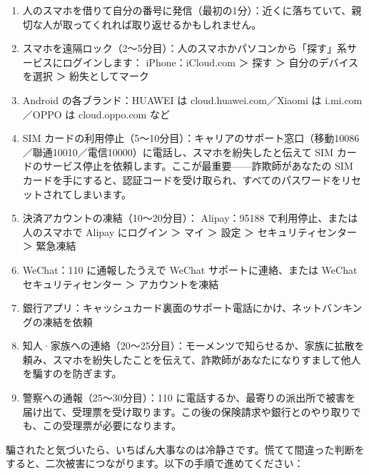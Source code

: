 \begin{enumerate}
  \item 人のスマホを借りて自分の番号に発信（最初の1分）：近くに落ちていて、親切な人が取ってくれれば取り返せるかもしれません。
  \item スマホを遠隔ロック（2〜5分目）：人のスマホかパソコンから「探す」系サービスにログインします： iPhone：iCloud.com ＞ 探す ＞ 自分のデバイスを選択 ＞ 紛失としてマーク
  \item Android の各ブランド：HUAWEI は cloud.huawei.com／Xiaomi は i.mi.com／OPPO は cloud.oppo.com など
  \item SIM カードの利用停止（5〜10分目）：キャリアのサポート窓口（移動10086／聯通10010／電信10000）に電話し、スマホを紛失したと伝えて SIM カードのサービス停止を依頼します。ここが最重要——詐欺師があなたの SIM カードを手にすると、認証コードを受け取られ、すべてのパスワードをリセットされてしまいます。
  \item 決済アカウントの凍結（10〜20分目）： Alipay：95188 で利用停止、または人のスマホで Alipay にログイン ＞ マイ ＞ 設定 ＞ セキュリティセンター ＞ 緊急凍結
  \item WeChat：110 に通報したうえで WeChat サポートに連絡、または WeChat セキュリティセンター ＞ アカウントを凍結
  \item 銀行アプリ：キャッシュカード裏面のサポート電話にかけ、ネットバンキングの凍結を依頼
  \item 知人·家族への連絡（20〜25分目）：モーメンツで知らせるか、家族に拡散を頼み、スマホを紛失したことを伝えて、詐欺師があなたになりすまして他人を騙すのを防ぎます。
  \item 警察への通報（25〜30分目）：110 に電話するか、最寄りの派出所で被害を届け出て、受理票を受け取ります。この後の保険請求や銀行とのやり取りでも、この受理票が必要になります。
\end{enumerate}


騙されたと気づいたら、いちばん大事なのは冷静さです。慌てて間違った判断をすると、二次被害につながります。以下の手順で進めてください：

